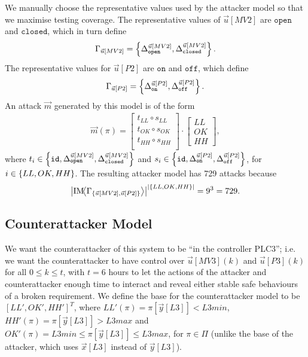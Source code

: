 {{We manually choose the representative values used by the attacker model so that we maximise testing coverage. The representative values of $\vec{u}[MV2]$ are $\texttt{open}$ and $\texttt{closed}$, which in turn define 
\begin{align*}
  \Gamma_{\vec{u}[MV2]}=\left\{{\Delta}^{\vec{u}[MV2]}_{\texttt{open}}, {\Delta}^{\vec{u}[MV2]}_{\texttt{closed}}\right\}.
\end{align*}
The representative values for $\vec{u}[P2]$ are $\texttt{on}$ and $\texttt{off}$, which define 
\begin{align*}
  \Gamma_{\vec{u}[P2]}=\left\{{\Delta}^{\vec{u}[P2]}_{\texttt{on}}, {\Delta}^{\vec{u}[P2]}_{\texttt{off}}\right\}.
\end{align*}
An attack $\vec{m}$ generated by this model is of the form
\begin{align*}
  \vec{m}(\pi)=
  \begin{bmatrix}
    t_{LL}\circ s_{LL} \\
    t_{OK}\circ s_{OK} \\
    t_{HH}\circ s_{HH} \\
  \end{bmatrix}
  \cdot
  \begin{bmatrix}
    LL \\
    OK \\
    HH
  \end{bmatrix},
\end{align*} 
where $t_i\in \left\{{\texttt{id}},{\Delta}^{\vec{u}[MV2]}_{\texttt{open}}, {\Delta}^{\vec{u}[MV2]}_{\texttt{closed}}\right\}$ and  $s_i\in\left\{{\texttt{id}},{\Delta}^{\vec{u}[P2]}_{\texttt{on}}, {\Delta}^{\vec{u}[P2]}_{\texttt{off}}\right\}$, for $i\in \left\{LL,OK,HH\right\}$. The resulting attacker model has 729 attacks because
 \begin{align*}
  \left| \text{IM}\!{{\left<\Gamma_{\left\{\vec{u}[MV2],\vec{u}[P2]\right\}}\right>}}\right|^{\left|\left\{{LL},{OK},{HH}\right\}\right|}=9^3=729.
\end{align*}

\subsection{Counterattacker Model}
We want the counterattacker of this system to be ``in the controller PLC3''; i.e. we want the counterattacker to have control over $\vec{u}[MV3](k)$ and $\vec{u}[P3](k)$ for all $0\leq k\leq t$, with $t=6$ hours to let the actions of the attacker and counterattacker enough time to interact and reveal either stable safe behaviours of a broken requirement. We define the base for the counterattacker model to be $[LL', OK', HH']^T$, where ${LL'}(\pi)=\pi[\vec{y}[L3]]<L3min$, ${HH'}(\pi)=\pi[\vec{y}[L3]]>L3max$ and ${OK'}(\pi)=L3min \leq \pi[\vec{y}[L3]]\leq L3max$, for $\pi \in \Pi$ (unlike the base of the attacker, which uses $\vec{x}[L3]$ instead of $\vec{y}[L3]$). %

}}
